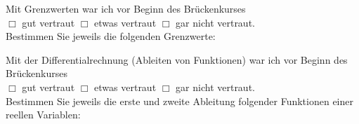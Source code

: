 \documentclass[12pt]{exam}
\begin{document}
\begin{questions}
Mit Grenzwerten war ich vor Beginn des Brückenkurses\\ $\Box$ gut vertraut \hfill $\Box$ etwas vertraut \hfill $\Box$ gar nicht vertraut. \\[2ex]
Bestimmen Sie jeweils die folgenden Grenzwerte:\\

\pagebreak


Mit der Differentialrechnung (Ableiten von Funktionen) war ich vor Beginn des Brückenkurses\\ $\Box$ gut vertraut \hfill $\Box$ etwas vertraut \hfill $\Box$ gar nicht vertraut. \\[2ex]
Bestimmen Sie jeweils die erste und zweite Ableitung folgender
Funktionen einer reellen Variablen:\\

\begin{parts}

\part \[\begin{array}{ll}
 f(x)  &=x^5\\ ~~\\
 f'(x) &= \\ ~~\\
 f''(x)&= \\ ~~\\
\end{array}~~~~~~~~~~~~~~~~~~~~~~~~~~~~~~~~~~~~~~~~~~~~~~~~~~~~~~~~~~~~~~~~~~~~\]


\end{parts}
\end{questions}
\end{document}
